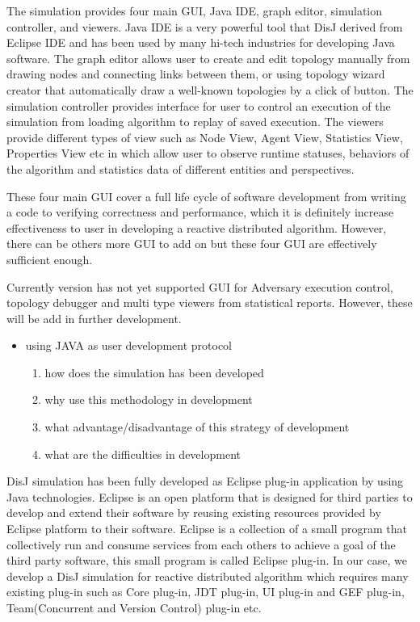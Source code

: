 The simulation provides four main GUI, Java IDE, graph editor, simulation controller, and viewers. Java IDE is a very powerful tool that DisJ derived from Eclipse IDE and has been used by many hi-tech industries for developing Java software. The graph editor allows user to create and edit topology manually from drawing nodes and connecting links between them, or using topology wizard creator that automatically draw a well-known topologies by a click of button. The simulation controller provides interface for user to control an execution of the simulation from loading algorithm to replay of saved execution. The viewers provide different types of view such as Node View, Agent View, Statistics View, Properties View etc in which allow user to observe runtime statuses, behaviors of the algorithm and statistics data of different entities and perspectives.

These four main GUI cover a full life cycle of software development from writing a code to verifying correctness and performance, which it is definitely increase effectiveness to user in developing a reactive distributed algorithm. However, there can be others more GUI to add on but these four GUI are effectively sufficient enough.

Currently version has not yet supported GUI for Adversary execution control, topology debugger and multi type viewers from statistical reports. However, these will be add in further development.

\begin{itemize}
\item using JAVA as user development protocol
    \begin{enumerate}
    \item how does the simulation has been developed
    \item why use this methodology in development
    \item what advantage/disadvantage of this strategy of development
    \item what are the difficulties in development
    \end{enumerate}
\end{itemize}

DisJ simulation has been fully developed as Eclipse plug-in application by using Java technologies. Eclipse is an open platform that is designed for third parties to develop and extend their software by reusing existing resources provided by Eclipse platform to their software. Eclipse is a collection of a small program that collectively run and consume services from each others to achieve a goal of the third party software, this small program is called Eclipse plug-in. In our case, we develop a DisJ simulation for reactive distributed algorithm which requires many existing plug-in such as Core plug-in, JDT plug-in, UI plug-in and GEF plug-in, Team(Concurrent and Version Control) plug-in etc.

